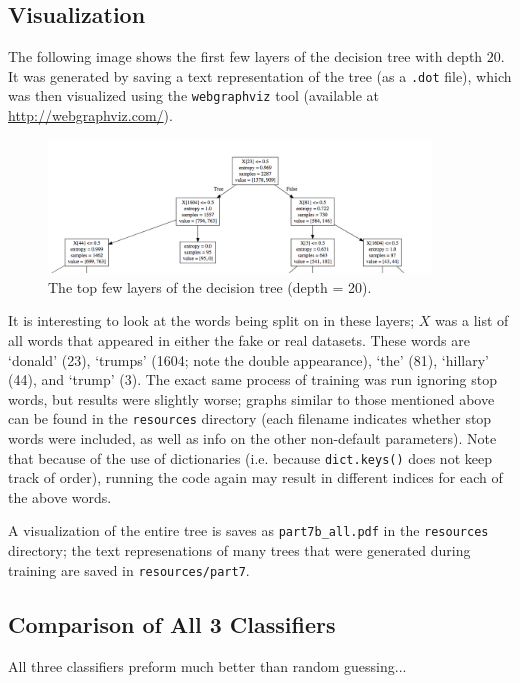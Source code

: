 \documentclass{article}
\begin{document}
   \subsection{Visualization}
   The following image shows the first few layers of the decision tree with depth $20$. It was generated by saving
   a text representation of the tree (as a \texttt{.dot} file), which was then visualized using the
   \texttt{webgraphviz} tool (available at \url{http://webgraphviz.com/}).
      \begin{figure}[h] \centering
         \includegraphics[width=4in]{resources/part7b}
         \caption{The top few layers of the decision tree (depth = 20).}
         \label{part7b}
      \end{figure}

   It is interesting to look at the words being split on in these layers; $X$ was a list of all words
   that appeared in either the fake or real datasets. These words are `donald' (23), `trumps' (1604; note the
   double appearance), `the' (81), `hillary' (44), and `trump' (3). The exact same process of training was run
   ignoring stop words, but results were slightly worse; graphs similar to those mentioned above can be found
   in the \texttt{resources} directory (each filename indicates whether stop words were included, as well as info
   on the other non-default parameters). Note that because of the use of dictionaries (i.e. because
   \texttt{dict.keys()} does not keep track of order), running the code again may result in different indices
   for each of the above words.


   A visualization of the entire tree is saves as \texttt{part7b\_all.pdf}
   in the \texttt{resources} directory; the text represenations of many trees that were generated during
   training are saved in \texttt{resources/part7}.

   \subsection{Comparison of All 3 Classifiers}
   All three classifiers preform much better than random guessing...
\end{document}
